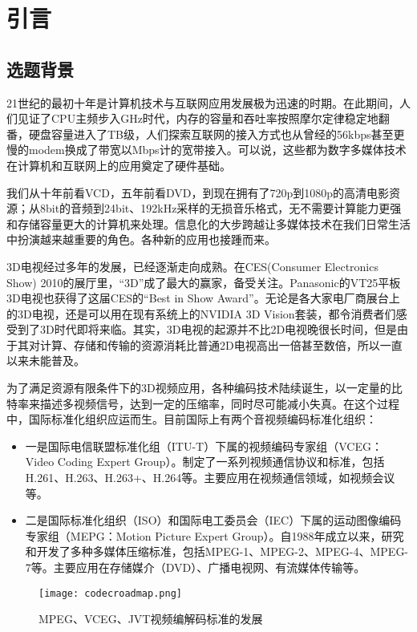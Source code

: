 

\chapter{引言}
\label{cha:intro}


\section{选题背景}
\label{sec:background}

21世纪的最初十年是计算机技术与互联网应用发展极为迅速的时期。在此期间，人们见证了CPU主频步入GHz时代，内存的容量和吞吐率按照摩尔定律稳定地翻番，硬盘容量进入了TB级，人们探索互联网的接入方式也从曾经的56kbps甚至更慢的modem换成了带宽以Mbps计的宽带接入。可以说，这些都为数字多媒体技术在计算机和互联网上的应用奠定了硬件基础。

我们从十年前看VCD，五年前看DVD，到现在拥有了720p到1080p的高清电影资源；从8bit的音频到24bit、192kHz采样的无损音乐格式，无不需要计算能力更强和存储容量更大的计算机来处理。信息化的大步跨越让多媒体技术在我们日常生活中扮演越来越重要的角色。各种新的应用也接踵而来。

3D电视经过多年的发展，已经逐渐走向成熟。在CES(Consumer Electronics Show) 2010的展厅里，“3D”成了最大的赢家，备受关注。Panasonic的VT25平板3D电视也获得了这届CES的“Best in Show Award”。无论是各大家电厂商展台上的3D电视，还是可以用在现有系统上的NVIDIA 3D Vision套装，都令消费者们感受到了3D时代即将来临。其实，3D电视的起源并不比2D电视晚很长时间\cite{smolic2007coding}，但是由于其对计算、存储和传输的资源消耗比普通2D电视高出一倍甚至数倍，所以一直以来未能普及。

为了满足资源有限条件下的3D视频应用，各种编码技术陆续诞生，以一定量的比特率来描述多视频信号，达到一定的压缩率，同时尽可能减小失真。在这个过程中，国际标准化组织应运而生。目前国际上有两个音视频编码标准化组织：
\begin{itemize}
\item 一是国际电信联盟标准化组（ITU-T）下属的视频编码专家组（VCEG：Video Coding Expert Group）。制定了一系列视频通信协议和标准，包括H.261、H.263、H.263+、H.264等。主要应用在视频通信领域，如视频会议等。
\item 二是国际标准化组织（ISO）和国际电工委员会（IEC）下属的运动图像编码专家组（MEPG：Motion Picture Expert Group）。自1988年成立以来，研究和开发了多种多媒体压缩标准，包括MPEG-1、MPEG-2、MPEG-4、MPEG-7等。主要应用在存储媒介（DVD）、广播电视网、有流媒体传输等。
\end{itemize}
\begin{figure}[htbp]
\begin{center}
\texttt{[image: codecroadmap.png]}
\caption{MPEG、VCEG、JVT视频编解码标准的发展}
\label{fig:codecroadmap}
\end{center}
\end{figure}

